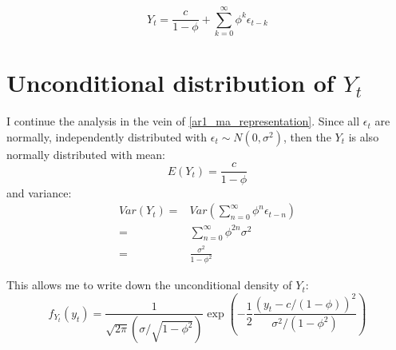 \documentclass[12pt]{article}
\begin{document}
\begin{equation*}
\label{ar1_ma_representation}
Y_t =  \frac{c}{1 - \phi} +
\sum_{k=0}^{\infty} \phi^k \epsilon_{t-k}
\end{equation*}


\section{Unconditional distribution of $Y_t$}
I continue the analysis in the vein of \eqref{ar1_ma_representation}. Since 
all $\epsilon_t$ are normally, independently distributed with 
$\epsilon_t \sim N(0, \sigma^2)$, then the $Y_t$ is also normally distributed
with mean:
\begin{equation*}
E(Y_t) = \frac{c}{1 - \phi}
\end{equation*}
and variance:
\begin{eqnarray*}
Var(Y_t) = & Var(\sum_{n=0}^{\infty} \phi^n \epsilon_{t-n}) \\
= & \sum_{n=0}^{\infty} \phi^{2n} \sigma^2 \\
= & \frac{\sigma^2}{1 - \phi^2}
\end{eqnarray*}

This allows me to write down the unconditional density of $Y_t$:
\begin{equation}
\label{unconditional_density}
f_{Y_t}(y_t) = \frac{1}{\sqrt{2 \pi} (\sigma / \sqrt{1-\phi^2})}
\exp \left( 
- \frac{1}{2} 
\frac{(y_t - c/(1-\phi))^2}{\sigma^2/(1-\phi^2)}
\right)
\end{equation}
\end{document}
